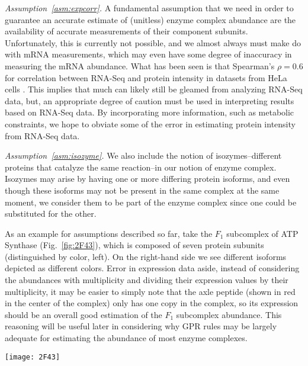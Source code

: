 \emph{Assumption~\ref{asm:expcorr}.}  A fundamental assumption
that we need in order to guarantee an accurate estimate of (unitless)
enzyme complex abundance are the availability of accurate measurements
of their component subunits. Unfortunately, this is currently not
possible, and we almost always must make do with mRNA measurements,
which may even have some degree of inaccuracy in measuring the mRNA
abundance. What has been seen is that Spearman's $\rho = 0.6$ for
correlation between RNA-Seq and protein intensity in datasets from
HeLa cells \citep{Nagaraj2011}. This implies that much can likely
still be gleamed from analyzing RNA-Seq data, but, an appropriate
degree of caution must be used in interpreting results based on
RNA-Seq data. By incorporating more information, such as metabolic
constraints, we hope to obviate some of the error in estimating
protein intensity from RNA-Seq data.

\emph{Assumption~\ref{asm:isozyme}.} We also include the notion of
isozymes--different proteins that catalyze the same reaction--in our
notion of enzyme complex. Isozymes may arise by having one or more
differing protein isoforms, and even though these isoforms may not be
present in the same complex at the same moment, we consider them to be
part of the enzyme complex since one could be substituted for the
other.

As an example for assumptions described so far, take the $F_1$
subcomplex of ATP Synthase (Fig.~\ref{fig:2F43}), which is composed
of seven protein subunits (distinguished by color, left). On the
right-hand side we see different isoforms depicted as different
colors.  Error in expression data aside, instead of considering the
abundances with multiplicity and dividing their expression values by
their multiplicity, it may be easier to simply note that the axle
peptide (shown in red in the center of the complex) only has one copy
in the complex, so its expression should be an overall good estimation
of the $F_1$ subcomplex abundance. This reasoning will be useful
later in considering why GPR rules may be largely adequate for estimating
the abundance of most enzyme complexes.

\begin{figure*}%
\centering
\texttt{[image: 2F43]}
\caption{Illustration of the $F_1$ part of the ATP Synthase complex
  (PDB ID 1E79; \citealt{Gibbons2000,Bernstein1978,Gezelter}).
  This illustration demonstrates both how an enzyme complex may be
  constituted by multiple subunits (left), and how some of those
  subunits may be products of the same gene and have differing
  stoichiometries within the complex (right).}
\label{fig:2F43}
\end{figure*}

